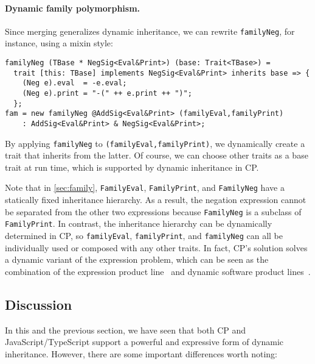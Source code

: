 \paragraph{Dynamic family polymorphism.}
Since merging generalizes dynamic inheritance, we can rewrite
\lstinline{familyNeg}, for instance, using a mixin style:
\begin{lstlisting}
familyNeg (TBase * NegSig<Eval&Print>) (base: Trait<TBase>) =
  trait [this: TBase] implements NegSig<Eval&Print> inherits base => {
    (Neg e).eval  = -e.eval;
    (Neg e).print = "-(" ++ e.print ++ ")";
  };
fam = new familyNeg @AddSig<Eval&Print> (familyEval,familyPrint)
    : AddSig<Eval&Print> & NegSig<Eval&Print>;
\end{lstlisting}
By applying \lstinline{familyNeg} to \lstinline{(familyEval,familyPrint)}, we
dynamically create a trait that inherits from the latter. Of course, we can
choose other traits as a base trait at run time, which is supported by dynamic
inheritance in CP.

Note that in \autoref{sec:family}, \lstinline{FamilyEval},
\lstinline{FamilyPrint}, and \lstinline{FamilyNeg} have a statically fixed
inheritance hierarchy. As a result, the negation expression cannot be separated
from the other two expressions because \lstinline{FamilyNeg} is a subclass of
\lstinline{FamilyPrint}. In contrast, the inheritance hierarchy can be
dynamically determined in CP, so \lstinline{familyEval},
\lstinline{familyPrint}, and \lstinline{familyNeg} can all be individually used
or composed with any other traits. In fact, CP's solution solves a dynamic
variant of the expression problem, which can be seen as the combination of the
expression product line~\citep{lopez2005evaluating} and dynamic software product
lines~\citep{hallsteinsen2008dynamic}.

\subsection{Discussion}

In this and the previous section, we have seen that both CP and
JavaScript/TypeScript support a powerful and expressive form of dynamic
inheritance. However, there are some important differences worth noting:

